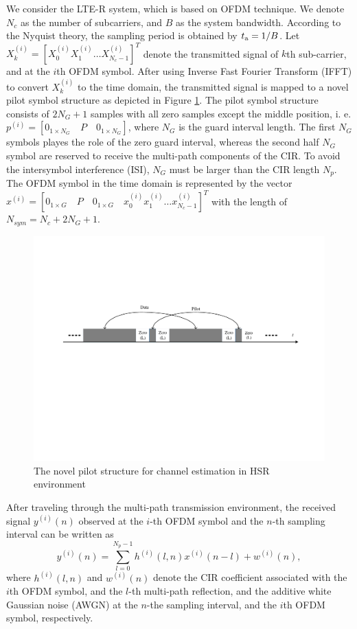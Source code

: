 \documentclass[12pt,journal,draftclsnofoot,onecolumn]{IEEEtran}
\begin{document}
We consider the LTE-R system, which is based on OFDM technique. We denote $N_{c}$ as the number of subcarriers, and $B$ as the system bandwidth. According to the Nyquist theory, the sampling period is obtained by $t_{\rm a}=1/B$. Let $X^{(i)}_{k}= [X^{(i)}_{0} X^{(i)}_{1} \dots  X^{(i)}_{N_c-1}]^{T}$ denote the transmitted signal of $k$th sub-carrier, and at the $i$th OFDM symbol. After using Inverse Fast Fourier Transform (IFFT) to convert $X^{(i)}_{k}$ to the time domain, the transmitted signal is mapped to a novel pilot symbol structure as depicted in Figure \ref{fig:pilot-pattern}. The pilot symbol structure consists of  $2N_G+1$ samples with all zero samples except the middle position, i. e. $p^{(i)}=[0_{1\times N_G}\quad P\quad  0_{1\times N_G}]$, where $N_G$ is the guard interval length. The first  $N_G$ symbols playes the role of the zero guard interval, whereas the second half $N_G$ symbol are reserved to receive the multi-path components of the CIR. To avoid the intersymbol interference (ISI), $N_G$ must be larger than the CIR length $N_p$. The OFDM symbol in the time domain is represented by the  vector $x^{(i)}=[0_{1\times G}\quad P\quad  0_{1\times G}\quad  x^{(i)}_{0} x^{(i)}_{1} \dots x^{(i)}_{N_c-1}]^{T}$ with the length of $ N_{sym}=N_c+2N_G+1$.
%
\begin{figure}[t]
		\centering
		\includegraphics[width=0.9\linewidth]{"figures/pilot pattern"}
		\caption{The novel pilot structure for channel estimation in HSR environment }
		\label{fig:pilot-pattern}
\end{figure}
%	
	
After traveling through the multi-path transmission environment, the received signal $ y^{(i)}(n)$ observed at the $i$-th OFDM symbol and the $n$-th sampling interval can be written as
%
\begin{equation}\label{eq-time received signal} 
	y^{(i)}(n)= \sum_{l=0}^{{N_p}-1}h^{(i)}(l,n) x^{(i)}(n-l) + w^{(i)}(n),
\end{equation}
%
where $h^{(i)}(l,n)$  and  $w^{(i)}(n)$ denote the CIR coefficient associated with the $i$th OFDM symbol, and the $l$-th multi-path reflection, and  the additive white Gaussian noise (AWGN) at the  $n$-the sampling interval, and the $i$th OFDM symbol, respectively.
	
\end{document}
